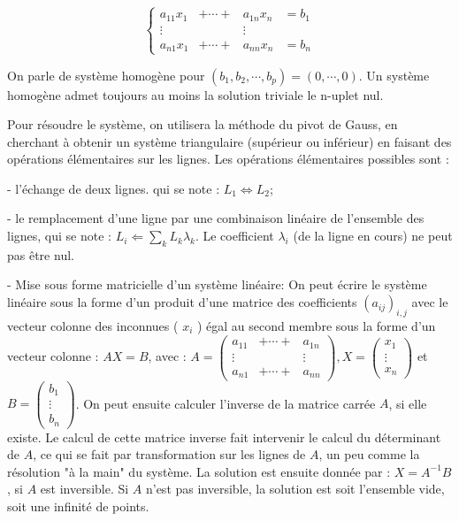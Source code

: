 $$
\left\{\begin{array}{cccc}
a_{11} x_1 & +\cdots+ & a_{1 n} x_n & =b_1 \\
\vdots & & \vdots & \\
a_{n 1} x_1 & +\cdots+ & a_{n n} x_n & =b_n
\end{array}\right.
$$

On parle de système homogène pour $\left(b_1, b_2, \cdots, b_p\right)=(0, \cdots, 0)$. Un système homogène admet toujours au moins la solution triviale le n-uplet nul.

Pour résoudre le système, on utilisera la méthode du pivot de Gauss, en cherchant à obtenir un système triangulaire (supérieur ou inférieur) en faisant des opérations élémentaires sur les lignes. Les opérations élémentaires possibles sont :

- l'échange de deux lignes. qui se note : $L_1 \Leftrightarrow L_2$;

- le remplacement d'une ligne par une combinaison linéaire de l'ensemble des lignes, qui se note : $L_i \Leftarrow \sum_k L_k \lambda_k$. Le coefficient $\lambda_i$ (de la ligne en cours) ne peut pas être nul.

- Mise sous forme matricielle d'un système linéaire: On peut écrire le système linéaire sous la forme d'un produit d'une matrice des coefficients $\left(a_{i j}\right)_{i, j}$ avec le vecteur colonne des inconnues ( $x_i$ ) égal au second membre sous la forme d'un vecteur colonne : $A X=B$, avec : $A=\left(\begin{array}{ccc}a_{11} & +\cdots+ & a_{1 n} \\ \vdots & & \vdots \\ a_{n 1} & +\cdots+ & a_{n n}\end{array}\right), X=\left(\begin{array}{c}x_1 \\ \vdots \\ x_n\end{array}\right)$ et $B=\left(\begin{array}{c}b_1 \\ \vdots \\ b_n\end{array}\right)$.
On peut ensuite calculer l'inverse de la matrice carrée $A$, si elle existe. Le calcul de cette matrice inverse fait intervenir le calcul du déterminant de $A$, ce qui se fait par transformation sur les lignes de $A$, un peu comme la résolution "à la main" du système. La solution est ensuite donnée par : $X=A^{-1} B$, si $A$ est inversible. Si $A$ n'est pas inversible, la solution est soit l'ensemble vide, soit une infinité de points.